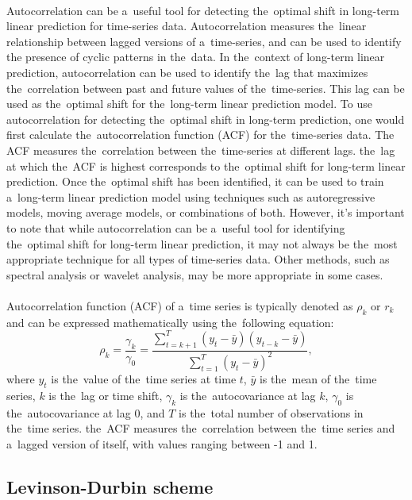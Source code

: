 \\
Autocorrelation can be a~useful tool for detecting the~optimal shift in long-term linear prediction for time-series data.
Autocorrelation measures the~linear relationship between lagged versions of a~time-series, and can be used to identify
the presence of cyclic patterns in the~data. In the~context of long-term linear prediction, autocorrelation can be
used to identify the~lag that maximizes the~correlation between past and future values of the~time-series. This lag can
be used as the~optimal shift for the~long-term linear prediction model. To use autocorrelation for detecting the~optimal
shift in long-term prediction, one would first calculate the~autocorrelation function (ACF) for the~time-series data.
The ACF measures the~correlation between the~time-series at different lags. the~lag at which the~ACF is highest
corresponds to the~optimal shift for long-term linear prediction. Once the~optimal shift has been identified, it can
be used to train a~long-term linear prediction model using techniques such as autoregressive models, moving average
models, or combinations of both. However, it's important to note that while autocorrelation can be a~useful tool for
identifying the~optimal shift for long-term linear prediction, it may not always be the~most appropriate technique for
all types of time-series data. Other methods, such as spectral analysis or wavelet analysis, may be more
appropriate in some cases.\\
\\
Autocorrelation function (ACF) of a~time series is typically denoted as $\rho_k$ or $r_k$ and can be expressed
mathematically using the~following equation:
\begin{equation}
    \rho_k = \frac{\gamma_k}{\gamma_0} = \frac{\sum_{t=k+1}^{T}(y_t - \bar{y})(y_{t-k} - \bar{y})}{\sum_{t=1}^{T}(y_t - \bar{y})^2},
\end{equation}
where $y_t$ is the~value of the~time series at time $t$, $\bar{y}$ is the~mean of the~time series, $k$ is the~lag or
time shift, $\gamma_k$ is the~autocovariance at lag $k$, $\gamma_0$ is the~autocovariance at lag 0, and $T$ is the~total number
of observations in the~time series. the~ACF measures the~correlation between the~time series and a~lagged version of
itself, with values ranging between -1 and 1.

\subsection{Levinson-Durbin scheme} \label{subsec:levinson}

